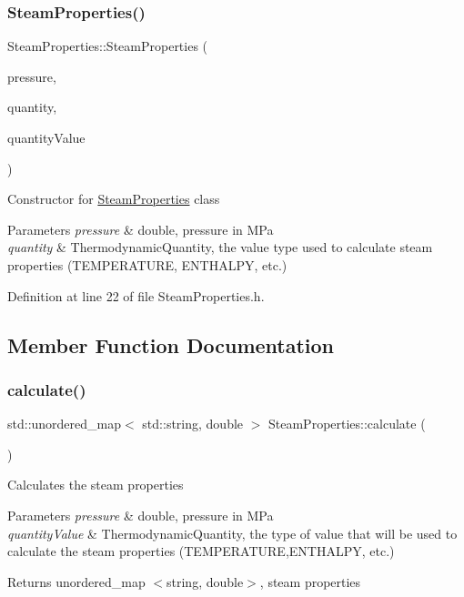 \subsubsection{\texorpdfstring{Steam\+Properties()}{SteamProperties()}}
{\footnotesize\ttfamily Steam\+Properties\+::\+Steam\+Properties (\begin{DoxyParamCaption}\item[{const double}]{pressure,  }\item[{const \hyperlink{class_steam_properties_ae0294bedf7d178c2d8fb6aed0f62fbff}{Thermodynamic\+Quantity}}]{quantity,  }\item[{const double}]{quantity\+Value }\end{DoxyParamCaption})\hspace{0.3cm}{\ttfamily [inline]}}

Constructor for \hyperlink{class_steam_properties}{Steam\+Properties} class 
\begin{DoxyParams}{Parameters}
{\em pressure} & double, pressure in M\+Pa \\
\hline
{\em quantity} & Thermodynamic\+Quantity, the value type used to calculate steam properties (T\+E\+M\+P\+E\+R\+A\+T\+U\+RE, E\+N\+T\+H\+A\+L\+PY, etc.) \\
\hline
\end{DoxyParams}


Definition at line 22 of file Steam\+Properties.\+h.



\subsection{Member Function Documentation}
\mbox{\label{class_steam_properties_a449e2da87adb5a207bc73ec90f87922a}} 
\subsubsection{\texorpdfstring{calculate()}{calculate()}}
{\footnotesize\ttfamily std\+::unordered\+\_\+map$<$ std\+::string, double $>$ Steam\+Properties\+::calculate (\begin{DoxyParamCaption}{ }\end{DoxyParamCaption})}

Calculates the steam properties


\begin{DoxyParams}{Parameters}
{\em pressure} & double, pressure in M\+Pa \\
\hline
{\em quantity\+Value} & Thermodynamic\+Quantity, the type of value that will be used to calculate the steam properties (T\+E\+M\+P\+E\+R\+A\+T\+U\+RE,E\+N\+T\+H\+A\+L\+PY, etc.)\\
\hline
\end{DoxyParams}
\begin{DoxyReturn}{Returns}
unordered\+\_\+map $<$string, double$>$, steam properties 
\end{DoxyReturn}


